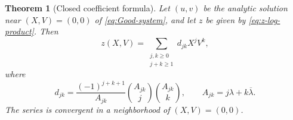 \documentclass[11pt,oneside]{article}
\theoremstyle{plain}
\newtheorem{theorem}{Theorem}[section]
\theoremstyle{definition}
\theoremstyle{remark}
\begin{document}
\begin{theorem}[Closed coefficient formula]
\label{thm:closed-coefficients}
Let \((u,v)\) be the analytic solution near \((X,V)=(0,0)\) of
\eqref{eq:Good-system}, and let \(z\) be given by
\eqref{eq:z-log-product}.  Then
\begin{equation}
 z(X,V)=\sum_{\substack{j,k\ge0\\j+k\ge1}}d_{jk}X^jV^k,
 \label{eq:z-double-series}
\end{equation}
where
\begin{equation}
 d_{jk}=\frac{(-1)^{j+k+1}}{A_{jk}}
 \binom{A_{jk}}{j}\binom{A_{jk}}{k},
 \qquad
 A_{jk}=j\lambda+k\overline\lambda.
 \label{eq:djk-theorem}
\end{equation}
The series is convergent in a neighborhood of \((X,V)=(0,0)\).
\end{theorem}
\end{document}
